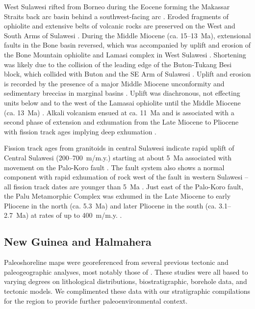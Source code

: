 \documentclass[11pt,letterpaper]{article}
\begin{document}
West Sulawesi rifted from Borneo during the Eocene forming the Makassar Straits back arc basin behind a southwest-facing arc \citep{Polve1997a}. Eroded fragments of ophiolite and extensive belts of volcanic rocks are preserved on the West and South Arms of Sulawesi \citep{Bergman1996a, vanLeeuwen2010a}. During the Middle Miocene (ca. 15--13~Ma), extensional faults in the Bone basin reversed, which was accompanied by uplift and erosion of the Bone Mountain ophiolite and Lamasi complex in West Sulawesi \citep{Bergman1996a, vanLeeuwen2010a}. Shortening was likely due to the collision of the leading edge of the Buton-Tukang Besi block, which collided with Buton and the SE Arm of Sulawesi \citep{Smith1991a}. Uplift and erosion is recorded by the presence of a major Middle Miocene unconformity and sedimentary breccias in marginal basins \citep{Bergman1996a, vanLeeuwen2010a}. Uplift was diachronous, not effecting units below and to the west of the Lamasai ophiolite until the Middle Miocene (ca. 13~Ma) \citep{vanLeeuwen2010a}. Alkali volcanism ensued at ca. 11~Ma and is associated with a second phase of extension and exhumation from the Late Miocene to Pliocene with fission track ages implying deep exhumation \citep{Smith1991a, Bergman1996a, vanLeeuwen2010a}.

Fission track ages from granitoids in central Sulawesi indicate rapid uplift of Central Sulawesi (200--700~m/m.y.) starting at about 5~Ma associated with movement on the Palo-Koro fault \citep{Bellier2006a}. The fault system also shows a normal component with rapid exhumation of rock west of the fault in western Sulawesi -- all fission track dates are younger than 5~Ma \citep{Bellier2006a}. Just east of the Palo-Koro fault, the Palu Metamorphic Complex was exhumed in the Late Miocene to early Pliocene in the north (ca. 5.3~Ma) and later Pliocene in the south (ca. 3.1--2.7~Ma) at rates of up to 400~m/m.y. \citep{Hennig2017b}.

\subsection*{New Guinea and Halmahera}

Paleoshoreline maps were georeferenced from several previous tectonic and paleogeographic analyses, most notably those of \citet{Nichols1991a, Cloos2005a, Gold2017a, Harrington2017a}. These studies were all based to varying degrees on lithological distributions, biostratigraphic, borehole data, and tectonic models. We complimented these data with our stratigraphic compilations for the region to provide further paleoenvironmental context.
\end{document}
